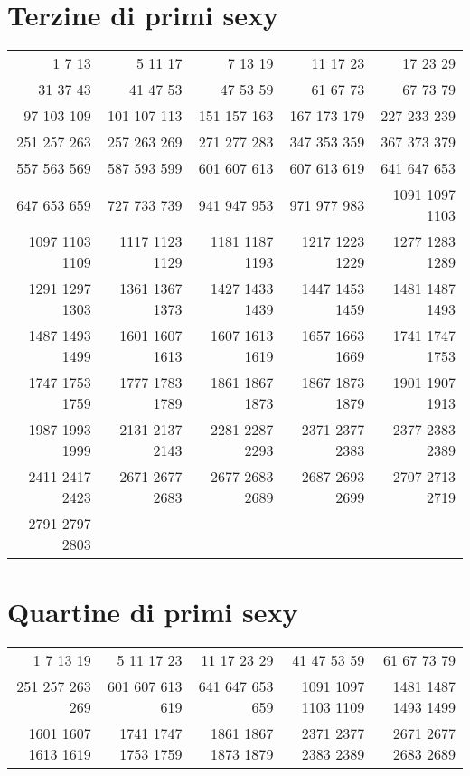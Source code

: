\section{Terzine di primi sexy}
\begin{center}
 \footnotesize
 \begin{tabular}{*{5}{r}}
  \toprule 
1 7 13 & 5 11 17 & 7 13 19 & 11 17 23 & 17 23 29\\
31 37 43 & 41 47 53 & 47 53 59 & 61 67 73 & 67 73 79\\
97 103 109 & 101 107 113 & 151 157 163 & 167 173 179 & 227 233 239\\
251 257 263 & 257 263 269 & 271 277 283 & 347 353 359 & 367 373 379\\
557 563 569 & 587 593 599 & 601 607 613 & 607 613 619 & 641 647 653\\
647 653 659 & 727 733 739 & 941 947 953 & 971 977 983 & 1091 1097 1103\\
1097 1103 1109 & 1117 1123 1129 & 1181 1187 1193 & 1217 1223 1229 & 1277 1283 1289\\
1291 1297 1303 & 1361 1367 1373 & 1427 1433 1439 & 1447 1453 1459 & 1481 1487 1493\\
1487 1493 1499 & 1601 1607 1613 & 1607 1613 1619 & 1657 1663 1669 & 1741 1747 1753\\
1747 1753 1759 & 1777 1783 1789 & 1861 1867 1873 & 1867 1873 1879 & 1901 1907 1913\\
1987 1993 1999 & 2131 2137 2143 & 2281 2287 2293 & 2371 2377 2383 & 2377 2383 2389\\
2411 2417 2423 & 2671 2677 2683 & 2677 2683 2689 & 2687 2693 2699 & 2707 2713 2719\\
2791 2797 2803 \\  
  \bottomrule
 \end{tabular}
\end{center}
\section{Quartine di primi sexy}
\begin{center}
 \footnotesize
 \begin{tabular}{*{5}{r}}
  \toprule 
1 7 13 19 & 5 11 17 23 & 11 17 23 29 & 41 47 53 59 & 61 67 73 79 \\
251 257 263 269 & 601 607 613 619 & 641 647 653 659 & 1091 1097 1103 1109 & 1481 1487 1493 1499 \\
1601 1607 1613 1619 & 1741 1747 1753 1759 & 1861 1867 1873 1879 & 2371 2377 2383 2389 & 2671 2677 2683 2689 \\ 
  \bottomrule
 \end{tabular}
\end{center}
